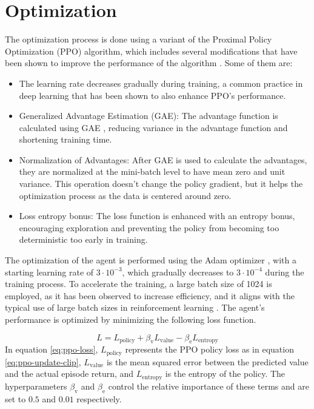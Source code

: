 \section{Optimization}
The optimization process is done using a variant of the Proximal Policy Optimization (PPO) algorithm, which includes several modifications that have been shown to improve the performance of the algorithm \cite{ppo-implementation-details}. Some of them are:
\begin{itemize}
    \item The learning rate decreases gradually during training, a common practice in deep learning that has been shown to also enhance PPO's performance.
    \item Generalized Advantage Estimation (GAE): The advantage function is calculated using GAE \cite{schulman2015high}, reducing variance in the advantage function and shortening training time.
    \item Normalization of Advantages: After GAE is used to calculate the advantages, they are normalized at the mini-batch level to have mean zero and unit variance. This operation doesn't change the policy gradient, but it helps the optimization process as the data is centered around zero.
    \item Loss entropy bonus: The loss function is enhanced with an entropy bonus, encouraging exploration and preventing the policy from becoming too deterministic too early in training.
\end{itemize}

The optimization of the agent is performed using the Adam optimizer \cite{kingma2014adam}, with a starting learning rate of $3 \cdot 10^{-3}$, which gradually decreases to $3 \cdot 10^{-4}$ during the training process. To accelerate the training, a large batch size of 1024 is employed, as it has been observed to increase efficiency, and it aligns with the typical use of large batch sizes in reinforcement learning \cite{mccandlish2018empirical}. The agent's performance is optimized by minimizing the following loss function.

\begin{equation}
    L = L_{\textrm{policy}} + \beta_\textrm{v} L_\textrm{value} - \beta_\textrm{e} L_\textrm{entropy}
    \label{eq:ppo-loss}
\end{equation}
In equation \eqref{eq:ppo-loss}, $L_{\textrm{policy}}$ represents the PPO policy loss as in equation \eqref{eq:ppo-update-clip}, $L_\textrm{value}$ is the mean squared error between the predicted value and the actual episode return, and $L_\textrm{entropy}$ is the entropy of the policy. The hyperparameters $\beta_\textrm{v}$ and $\beta_\textrm{e}$ control the relative importance of these terms and are set to $0.5$ and $0.01$ respectively.

